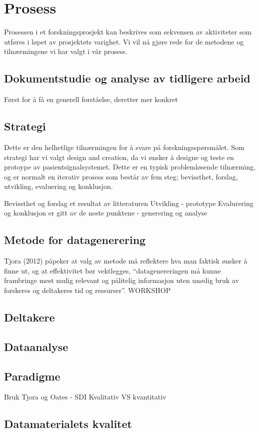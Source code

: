 \section{Prosess}
\label{chp: prosess}

Prosessen i et forskningsprosjekt kan beskrives som sekvensen av aktiviteter som utføres i løpet av prosjektets varighet. Vi vil nå gjøre rede for de metodene og tilnærmingene vi har valgt i vår prosess.

\subsection{Dokumentstudie og analyse av tidligere arbeid}
	Først for å få en generell forståelse, deretter mer konkret
	
\subsection{Strategi}
Dette er den helhetlige tilnærmingen for å svare på forskningsspørsmålet. Som strategi har vi valgt design and creation, da vi ønsker å designe og teste en protoype av pasientsignalsystemet. Dette er en typisk problemløsende tilnærming, og er normalt en iterativ prosess som består av fem steg; bevissthet, forslag, utvikling, evaluering og konklusjon. 

	Bevissthet og forslag et resultat av litteraturen
	Utvikling - prototype
	Evalurering og konklusjon er gitt av de neste punktene - generering og analyse

\subsection{Metode for datagenerering}
Tjora (2012) påpeker at valg av metode må reflektere hva man faktisk ønsker å finne ut, og at effektivitet bør vektlegges, “datagenereringen må kunne frambringe mest mulig relevant og pålitelig informasjon uten unødig bruk av forskeres og deltakeres tid og ressurser”.
WORKSHOP

\subsection{Deltakere}

\subsection{Dataanalyse}

\subsection{Paradigme}
Bruk Tjora og Oates - SDI
Kvalitativ VS kvantitativ

\subsection{Datamaterialets kvalitet}


